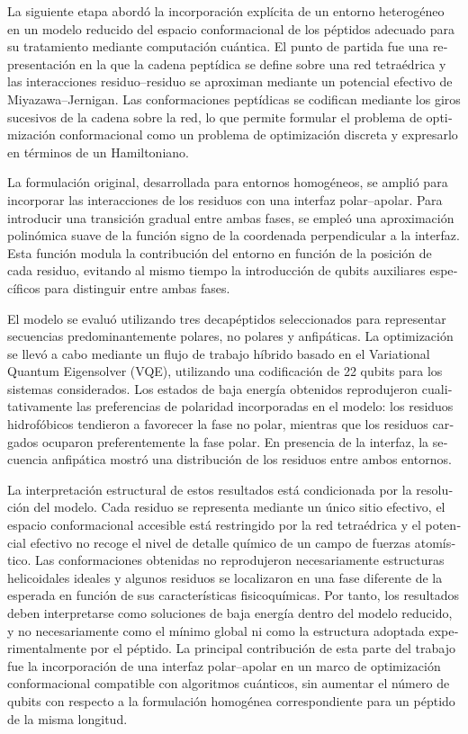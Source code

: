 \begin{otherlanguage}{spanish}
La siguiente etapa abordó la incorporación explícita de un entorno heterogéneo en un modelo reducido del espacio conformacional de los péptidos adecuado para su tratamiento mediante computación cuántica. El punto de partida fue una representación en la que la cadena peptídica se define sobre una red tetraédrica y las interacciones residuo--residuo se aproximan mediante un potencial efectivo de Miyazawa--Jernigan. Las conformaciones peptídicas se codifican mediante los giros sucesivos de la cadena sobre la red, lo que permite formular el problema de optimización conformacional como un problema de optimización discreta y expresarlo en términos de un Hamiltoniano.

La formulación original, desarrollada para entornos homogéneos, se amplió para incorporar las interacciones de los residuos con una interfaz polar--apolar. Para introducir una transición gradual entre ambas fases, se empleó una aproximación polinómica suave de la función signo de la coordenada perpendicular a la interfaz. Esta función modula la contribución del entorno en función de la posición de cada residuo, evitando al mismo tiempo la introducción de qubits auxiliares específicos para distinguir entre ambas fases.

El modelo se evaluó utilizando tres decapéptidos seleccionados para representar secuencias predominantemente polares, no polares y anfipáticas. La optimización se llevó a cabo mediante un flujo de trabajo híbrido basado en el Variational Quantum Eigensolver (VQE), utilizando una codificación de 22 qubits para los sistemas considerados. Los estados de baja energía obtenidos reprodujeron cualitativamente las preferencias de polaridad incorporadas en el modelo: los residuos hidrofóbicos tendieron a favorecer la fase no polar, mientras que los residuos cargados ocuparon preferentemente la fase polar. En presencia de la interfaz, la secuencia anfipática mostró una distribución de los residuos entre ambos entornos.

La interpretación estructural de estos resultados está condicionada por la resolución del modelo. Cada residuo se representa mediante un único sitio efectivo, el espacio conformacional accesible está restringido por la red tetraédrica y el potencial efectivo no recoge el nivel de detalle químico de un campo de fuerzas atomístico. Las conformaciones obtenidas no reprodujeron necesariamente estructuras helicoidales ideales y algunos residuos se localizaron en una fase diferente de la esperada en función de sus características fisicoquímicas. Por tanto, los resultados deben interpretarse como soluciones de baja energía dentro del modelo reducido, y no necesariamente como el mínimo global ni como la estructura adoptada experimentalmente por el péptido. La principal contribución de esta parte del trabajo fue la incorporación de una interfaz polar--apolar en un marco de optimización conformacional compatible con algoritmos cuánticos, sin aumentar el número de qubits con respecto a la formulación homogénea correspondiente para un péptido de la misma longitud.


\end{otherlanguage}
